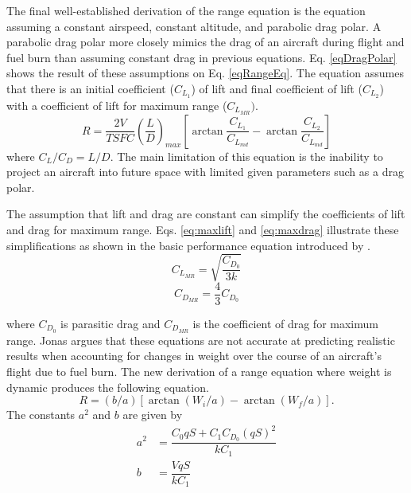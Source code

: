 The final well-established derivation of the range equation is the equation assuming a constant airspeed, constant altitude, and parabolic drag polar. A parabolic drag polar more closely mimics the drag of an aircraft during flight and fuel burn than assuming constant drag in previous equations. Eq. \ref{eqDragPolar} shows the result of these assumptions on Eq. \ref{eqRangeEq}. The equation assumes that there is an initial coefficient ($C_{L_1}$) of lift and final coefficient of lift ($C_{L_2}$) with a coefficient of lift for maximum range ($C_{L_{MR}})$.
\begin{equation}
\label{eqDragPolar}
    R = \dfrac{2V}{TSFC}\left(\dfrac{L}{D}\right)_{max}\left[\arctan\dfrac{C_{L_1}}{C_{L_{md}}}-\arctan\dfrac{C_{L_2}}{C_{L_{md}}}\right]
\end{equation}
where $C_L/C_D = L/D$. The main limitation of this equation is the inability to project an aircraft into future space with limited given parameters such as a drag polar.\par
The assumption that lift and drag are constant can simplify the coefficients of lift and drag for maximum range. Eqs. \ref{eq:maxlift} and \ref{eq:maxdrag} illustrate these simplifications as shown in the basic performance equation introduced by \cite{OptimizeBreguet}.
\begin{equation}
C_{L_{MR}} = \sqrt{\dfrac{C_{D_0}}{3k}}
\label{eq:maxlift}
\end{equation}
\begin{equation}
C_{D_{MR}} = \dfrac{4}{3}C_{D_0}
\label{eq:maxdrag}
\end{equation}
\par
where $C_{D_0}$ is parasitic drag and $C_{D_{MR}}$ is the coefficient of drag for maximum range. Jonas \cite{Jonas} argues that these equations are not accurate at predicting realistic results when accounting for changes in weight over the course of an aircraft's flight due to fuel burn. The new derivation of a range equation where weight is dynamic produces the following equation.
\begin{equation}
    R = (b/a)[\arctan(W_i/a)-\arctan(W_f/a)].
    \label{eq:dynamicrange}
\end{equation}
The constants $a^2$ and $b$ are given by 
\begin{equation}
    \begin{aligned}
        a^2 &= \dfrac{C_0qS+C_1C_{D_0}(qS)^2}{k C_1}\\
        b &= \dfrac{VqS}{k C_1}
    \end{aligned}
\end{equation}
